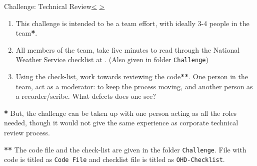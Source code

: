 \documentclass[12pt]{extarticle}
\newenvironment{instructionblock}{\Large\bgroup}{\egroup}
\begin{document}
\pagebreak
\begin{slide}{Challenge: Technical Review}{\hyperref[slide 17]{\textless} \hyperref[slide 19]{\textgreater}}
	\vskip 10pt
	\begin{instructionblock}
	\begin{enumerate}
	\item This challenge is intended to be a team effort, with ideally 3-4 people in the team\textbf{*}.	 
	\item All members of the team, take five minutes to read through the National Weather Service checklist at \cite{NWSCodeReview}. (Also given in folder \texttt{Challenge})
	\item Using the check-list, work towards reviewing the code\textbf{**}.  One person in the team, act as a moderator: to keep the process moving, and another person as a recorder/scribe.  What defects does one see?
	\end{enumerate}
	\end{instructionblock}
\end{slide}
\noindent
\textbf{*} But, the challenge can be taken up with one person acting as all the roles needed, though it would not give the same experience as corporate technical review process.

\vspace{4mm}
\noindent
\textbf{**} The code file and the check-list are given in the folder \texttt{Challenge}. File with code is titled as \texttt{Code File} and checklist file is titled as \texttt{OHD-Checklist}.



\end{document}

